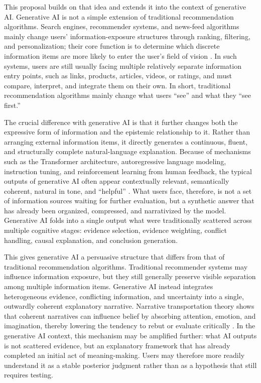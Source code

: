 This proposal builds on that idea and extends it into the context of generative AI. Generative AI is not a simple extension of traditional recommendation algorithms. Search engines, recommender systems, and news-feed algorithms mainly change users' information-exposure structures through ranking, filtering, and personalization; their core function is to determine which discrete information items are more likely to enter the user's field of vision \citep{ResnickVarian1997,AdomaviciusTuzhilin2005,Bozdag2013}. In such systems, users are still usually facing multiple relatively separate information entry points, such as links, products, articles, videos, or ratings, and must compare, interpret, and integrate them on their own. In short, traditional recommendation algorithms mainly change what users ``see'' and what they ``see first.''

The crucial difference with generative AI is that it further changes both the expressive form of information and the epistemic relationship to it. Rather than arranging external information items, it directly generates a continuous, fluent, and structurally complete natural-language explanation. Because of mechanisms such as the Transformer architecture, autoregressive language modeling, instruction tuning, and reinforcement learning from human feedback, the typical outputs of generative AI often appear contextually relevant, semantically coherent, natural in tone, and ``helpful'' \citep{Vaswani2017,Brown2020,Ouyang2022}. What users face, therefore, is not a set of information sources waiting for further evaluation, but a synthetic answer that has already been organized, compressed, and narrativized by the model. Generative AI folds into a single output what were traditionally scattered across multiple cognitive stages: evidence selection, evidence weighting, conflict handling, causal explanation, and conclusion generation.

This gives generative AI a persuasive structure that differs from that of traditional recommendation algorithms. Traditional recommender systems may influence information exposure, but they still generally preserve visible separation among multiple information items. Generative AI instead integrates heterogeneous evidence, conflicting information, and uncertainty into a single, outwardly coherent explanatory narrative. Narrative transportation theory shows that coherent narratives can influence belief by absorbing attention, emotion, and imagination, thereby lowering the tendency to rebut or evaluate critically \citep{GreenBrock2000}. In the generative AI context, this mechanism may be amplified further: what AI outputs is not scattered evidence, but an explanatory framework that has already completed an initial act of meaning-making. Users may therefore more readily understand it as a stable posterior judgment rather than as a hypothesis that still requires testing.

